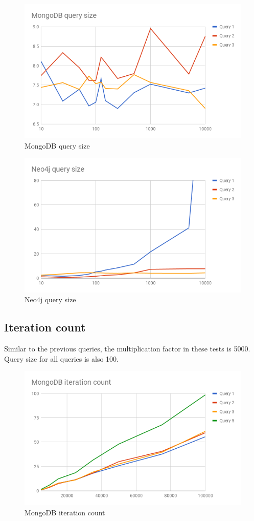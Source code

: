 \begin{figure}
  \centering
  \includegraphics[width=.8\textwidth]{img/mongodb-query-size.png}
  \caption{MongoDB query size}
  \label{fig:mongodb-query-size}
\end{figure}

\begin{figure}
  \centering
  \includegraphics[width=.8\textwidth]{img/neo4j-query-size.png}
  \caption{Neo4j query size}
  \label{fig:neo4j-query-size}
\end{figure}

\subsection{Iteration count}
\label{subsec:iteration-size}

Similar to the previous queries, the multiplication factor in these tests is 5000.
Query size for all queries is also 100.

\begin{figure}
  \centering
  \includegraphics[width=.8\textwidth]{img/mongodb-iteration-count.png}
  \caption{MongoDB iteration count}
  \label{fig:mongodb-iteration-count}
\end{figure}

